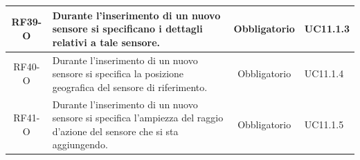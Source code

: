 \documentclass[a4paper, 12pt]{article}
\begin{document}
\begin{longtable}{|c|p{7cm}|c|p{4cm}|}
    \hline
    RF39-O & Durante l'inserimento di un nuovo sensore si specificano i dettagli relativi a tale sensore. & Obbligatorio & UC11.1.3\\
    \hline
    RF40-O & Durante l'inserimento di un nuovo sensore si specifica la posizione geografica del sensore di riferimento. & Obbligatorio & UC11.1.4\\
    \hline
    RF41-O & Durante l'inserimento di un nuovo sensore si specifica l'ampiezza del raggio d'azione del sensore che si sta aggiungendo. & Obbligatorio & UC11.1.5\\


    
    
    
    
    \bottomrule
\end{longtable}
\end{document}
